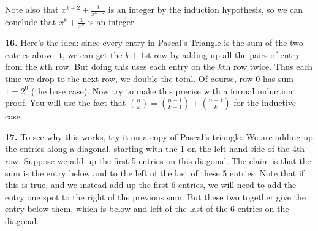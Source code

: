 \documentclass[10pt,]{book}
\theoremstyle{plain}
\theoremstyle{definition}
\theoremstyle{definition}
\theoremstyle{definition}
\numberwithin{equation}{chapter}
\begin{document}
Note also that \(x^{k-2} + \frac{1}{x^{k-2}}\) is an integer by the induction hypothesis, so we can conclude that \(x^k + \frac{1}{x^k}\) is an integer.
%
\par\smallskip
\noindent\textbf{16.}\quad{}
Here's the idea: since every entry in Pascal's Triangle is the sum of the two entries above it, we can get the \(k+1\)st row by adding up all the pairs of entry from the \(k\)th row. But doing this uses each entry on the \(k\)th row twice. Thus each time we drop to the next row, we double the total. Of course, row 0 has sum \(1 = 2^0\) (the base case). Now try to make this precise with a formal induction proof. You will use the fact that \({n \choose k} = {n-1 \choose k-1} + {n-1 \choose k}\) for the inductive case.
%
\par\smallskip
\noindent\textbf{17.}\quad{}
To see why this works, try it on a copy of Pascal's triangle. We are adding up the entries along a diagonal, starting with the 1 on the left hand side of the 4th row. Suppose we add up the first 5 entries on this diagonal. The claim is that the sum is the entry below and to the left of the last of these 5 entries. Note that if this is true, and we instead add up the first 6 entries, we will need to add the entry one spot to the right of the previous sum. But these two together give the entry below them, which is below and left of the last of the 6 entries on the diagonal.
\end{document}
